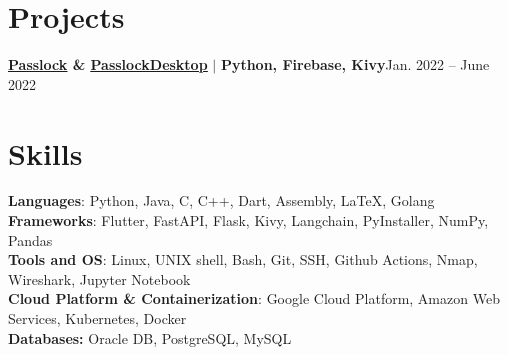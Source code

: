 \section{Projects}
\resumeSubHeadingListStart

\resumeProjectHeading
{\textbf{\href{https://github.com/AM-ash-OR-AM-I/Passlock}{\underline{Passlock}} \& \href{https://github.com/AM-ash-OR-AM-I/PasslockDesktop}{\underline{PasslockDesktop}}} $|$ \textbf{Python, Firebase, Kivy}}{Jan. 2022 -- June 2022}
\resumeItemListStart
{}
\resumeItemListEnd

\resumeSubHeadingListEnd

\vspace{-10px}
\section{Skills}
\begin{itemize}[leftmargin=0.15in, label={}]
  \small{\item{
        \textbf{Languages}{: Python, Java, C, C++, Dart, Assembly, LaTeX, Golang} \\
        \textbf{Frameworks}{: Flutter, FastAPI, Flask, Kivy, Langchain, PyInstaller, NumPy, Pandas} \\
        \textbf{Tools and OS}{: Linux, UNIX shell, Bash, Git, SSH, Github Actions, Nmap, Wireshark, Jupyter Notebook} \\
        \textbf{Cloud Platform \& Containerization}{: Google Cloud Platform, Amazon Web Services, Kubernetes, Docker} \\
        \textbf{Databases: }{Oracle DB, PostgreSQL, MySQL} \\
        }}

\end{itemize}

